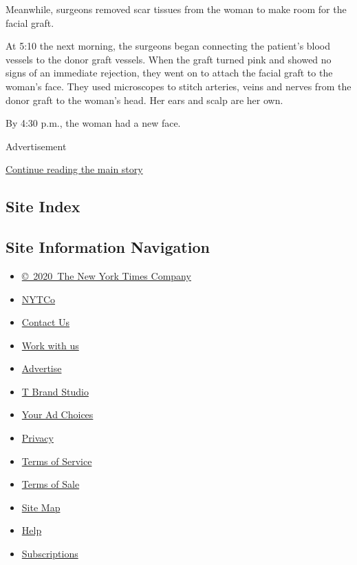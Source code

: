 Meanwhile, surgeons removed scar tissues from the woman to make room for
the facial graft.

At 5:10 the next morning, the surgeons began connecting the patient's
blood vessels to the donor graft vessels. When the graft turned pink and
showed no signs of an immediate rejection, they went on to attach the
facial graft to the woman's face. They used microscopes to stitch
arteries, veins and nerves from the donor graft to the woman's head. Her
ears and scalp are her own.

By 4:30 p.m., the woman had a new face.

Advertisement

\protect\hyperlink{after-bottom}{Continue reading the main story}

\hypertarget{site-index}{%
\subsection{Site Index}\label{site-index}}

\hypertarget{site-information-navigation}{%
\subsection{Site Information
Navigation}\label{site-information-navigation}}

\begin{itemize}
\tightlist
\item
  \href{https://help.nytimes.com/hc/en-us/articles/115014792127-Copyright-notice}{©~2020~The
  New York Times Company}
\end{itemize}

\begin{itemize}
\tightlist
\item
  \href{https://www.nytco.com/}{NYTCo}
\item
  \href{https://help.nytimes.com/hc/en-us/articles/115015385887-Contact-Us}{Contact
  Us}
\item
  \href{https://www.nytco.com/careers/}{Work with us}
\item
  \href{https://nytmediakit.com/}{Advertise}
\item
  \href{http://www.tbrandstudio.com/}{T Brand Studio}
\item
  \href{https://www.nytimes.com/privacy/cookie-policy\#how-do-i-manage-trackers}{Your
  Ad Choices}
\item
  \href{https://www.nytimes.com/privacy}{Privacy}
\item
  \href{https://help.nytimes.com/hc/en-us/articles/115014893428-Terms-of-service}{Terms
  of Service}
\item
  \href{https://help.nytimes.com/hc/en-us/articles/115014893968-Terms-of-sale}{Terms
  of Sale}
\item
  \href{https://spiderbites.nytimes.com}{Site Map}
\item
  \href{https://help.nytimes.com/hc/en-us}{Help}
\item
  \href{https://www.nytimes.com/subscription?campaignId=37WXW}{Subscriptions}
\end{itemize}
